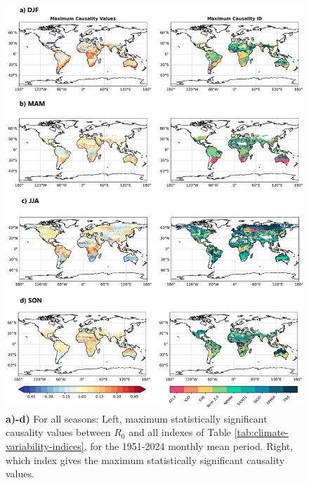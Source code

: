 \documentclass[10pt,twocolumn]{wlscirep}
\begin{document}
\begin{figure}[!ht]
  \centering
  \includegraphics[width=\textwidth]{causality_final_global_ps.png}
  \caption{\textbf{a)-d)} For all seasons: Left, maximum statistically significant causality values between $R_0$ and all indexes of Table \ref{tab:climate-variability-indices}, for the 1951-2024 monthly mean period. Right, which index gives the maximum statistically significant causality values. }
  \label{fig:global-causality-final}
\end{figure}
\end{document}
